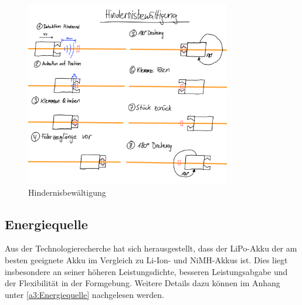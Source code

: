 \documentclass[../main.tex]{subfiles}
\begin{document}
\begin{figure}[H]
\centering
\includegraphics[width=0.8\textwidth]{img/lösungskonzpet/Skizzen/Skizze_Hindernisbewältigung.png}
\caption{Hindernisbewältigung}
\label{img:Skizze_Hindernisbewältigung}
\end{figure}

\newpage

\subsection{Energiequelle}
Aus der Technologierecherche hat sich herausgestellt, dass der LiPo-Akku der am besten geeignete Akku im Vergleich zu Li-Ion- und NiMH-Akkus ist. Dies liegt insbesondere an seiner höheren Leistungsdichte, besseren Leistungsabgabe und der Flexibilität in der Formgebung. Weitere Details dazu können im Anhang unter  \ref{a3:Energiequelle} nachgelesen werden.
\end{document}
